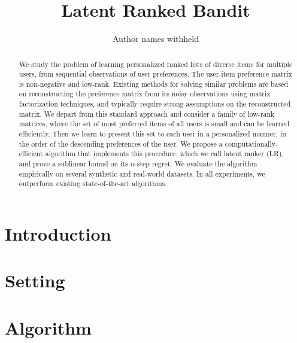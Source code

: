 \documentclass[letterpaper]{article} %
\begin{document}
%
\title{Latent Ranked Bandit}
\author{Author names withheld}
\maketitle
\begin{abstract}
We study the problem of learning personalized ranked lists of diverse items for multiple users, from sequential observations of user preferences. The user-item preference matrix is non-negative and low-rank. Existing methods for solving similar problems are based on reconstructing the preference matrix from its noisy observations using matrix factorization techniques, and typically require strong assumptions on the reconstructed matrix. We depart from this standard approach and consider a family of low-rank matrices, where the set of most preferred items of all users is small and can be learned efficiently. Then we learn to present this set to each user in a personalized manner, in the order of the descending preferences of the user. We propose a computationally-efficient algorithm that implements this procedure, which we call latent ranker (LR), and prove a sublinear bound on its $n$-step regret. We evaluate the algorithm empirically on several synthetic and real-world datasets. In all experiments, we outperform existing state-of-the-art algorithms.
\end{abstract}

\section{Introduction}
\label{sec:introduction}


\section{Setting}
\label{sec:setting}


\section{Algorithm}
\label{sec:algorithm}

\end{document}
